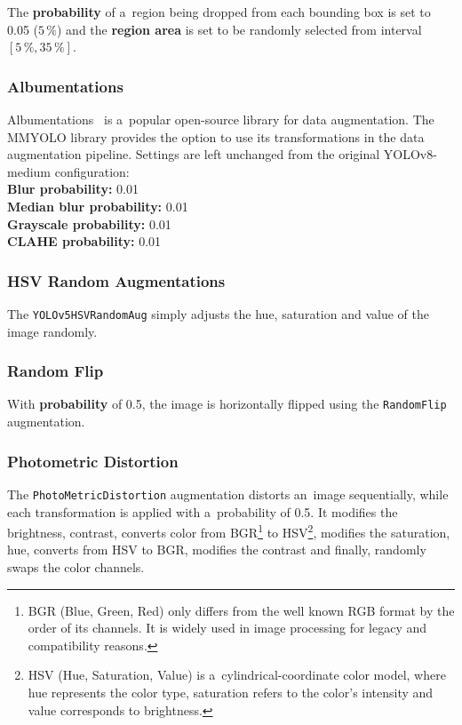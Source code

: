 The \textbf{probability} of a~region being dropped from each bounding box is set
to \num{0.05} ($5\,\%$) and the \textbf{region area} is set to be randomly selected from
interval $[5\,\%, 35\,\%]$.

\subsubsection*{Albumentations}

Albumentations~\cite{Albumentations} is a~popular open-source library for data
augmentation. The MMYOLO library provides the option to use its transformations
in the data augmentation pipeline. Settings are left unchanged from the original
YOLOv8-medium configuration: \\
\textbf{Blur probability:} 0.01 \\
\textbf{Median blur probability:} 0.01 \\
\textbf{Grayscale probability:} 0.01 \\
\textbf{CLAHE probability:} 0.01

\subsubsection*{HSV Random Augmentations}

The \texttt{YOLOv5HSVRandomAug} simply adjusts the hue, saturation and value of
the image randomly.

\subsubsection*{Random Flip}

With \textbf{probability} of 0.5, the image is horizontally flipped using the
\texttt{RandomFlip} augmentation.

\subsubsection*{Photometric Distortion}

The \texttt{PhotoMetricDistortion} augmentation distorts an~image sequentially,
while each transformation is applied with a~probability of 0.5. It modifies the
brightness, contrast, converts color from BGR\footnote{BGR (Blue, Green, Red)
only differs from the well known RGB format by the order of its channels. It is
widely used in image processing for legacy and compatibility reasons.} to
HSV\footnote{HSV (Hue, Saturation, Value) is a~cylindrical-coordinate color
model, where hue represents the color type, saturation refers to the color's
intensity and value corresponds to brightness.}, modifies the saturation,
hue, converts from HSV to BGR, modifies the contrast and finally, randomly swaps
the color channels.

